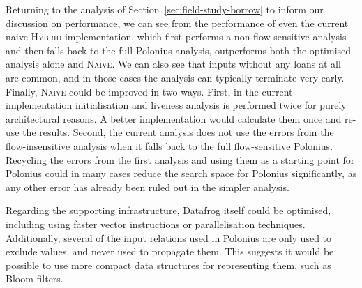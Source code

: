 \documentclass[11pt,a4paper,twoside,openany]{report}
\begin{document}
Returning to the analysis of Section~\ref{sec:field-study-borrow} to inform our
discussion on performance, we can see from the performance of even the current
naive \textsc{Hybrid} implementation, which first performs a non-flow sensitive
analysis and then falls back to the full Polonius analysis, outperforms both the
optimised analysis alone and \textsc{Naive}. We can also see that inputs without
any loans at all are common, and in those cases the analysis can typically
terminate very early. Finally, \textsc{Naive} could be improved in two ways.
First, in the current implementation initialisation and liveness analysis is
performed twice for purely architectural reasons. A better implementation would
calculate them once and re-use the results. Second, the current analysis does
not use the errors from the flow-insensitive analysis when it falls back to the
full flow-sensitive Polonius. Recycling the errors from the first analysis and
using them as a starting point for Polonius could in many cases reduce the
search space for Polonius significantly, as any other error has already been
ruled out in the simpler analysis.

Regarding the supporting infrastructure, Datafrog itself could be optimised,
including using faster vector instructions or parallelisation techniques.
Additionally, several of the input relations used in Polonius are only used to
exclude values, and never used to propagate them. This suggests it would be
possible to use more compact data structures for representing them, such as
Bloom filters.
\end{document}
